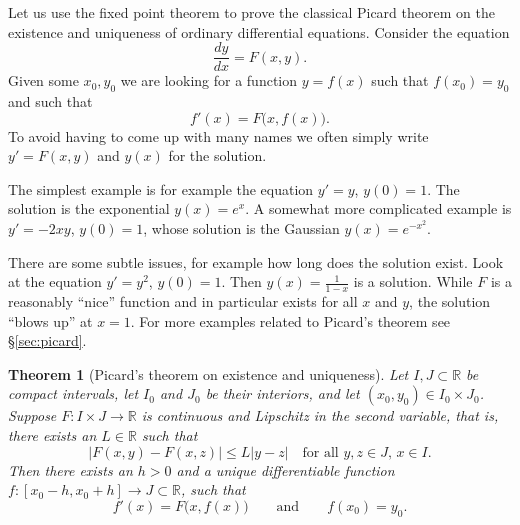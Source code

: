 \documentclass[12pt]{book}
\newcommand{\abs}[1]{\left\lvert {#1} \right\rvert}
\newcommand{\R}{{\mathbb{R}}}
\theoremstyle{plain}
\newtheorem{thm}{Theorem}[section]
\theoremstyle{remark}
\theoremstyle{definition}
\theoremstyle{exercise}
\theoremstyle{example}
\newcommand{\sectionref}[1]{\hyperref[#1]{\S\ref*{#1}}}
\begin{document}
\medskip

Let us use the
fixed point theorem
to prove the classical Picard theorem on the existence and uniqueness of
ordinary differential equations.
Consider the equation
\begin{equation*}
\frac{dy}{dx} = F(x,y) .
\end{equation*}
Given some $x_0, y_0$ we are looking for a function $y=f(x)$ such that
$f(x_0) = y_0$ and such that
\begin{equation*}
f'(x) = F\bigl(x,f(x)\bigr) .
\end{equation*}
To avoid having to come up with many names we often simply write $y' = F(x,y)$
and $y(x)$ for the solution.

The simplest example is for example the equation $y' = y$, $y(0) = 1$.
The solution is the exponential $y(x) = e^x$.  A somewhat more complicated
example is $y' = -2xy$, $y(0) = 1$, whose solution is the Gaussian
$y(x) = e^{-x^2}$.

There are some subtle issues, for example how long does the
solution exist.
Look at the equation $y' = y^2$, $y(0)=1$.  Then $y(x) = \frac{1}{1-x}$ is a
solution.  While $F$ is a reasonably ``nice'' function and in particular
exists for all $x$ and $y$, the solution ``blows up'' at $x=1$.
For more examples related to Picard's theorem see \sectionref{sec:picard}.

\begin{thm}[Picard's theorem on existence and uniqueness]%
Let $I, J \subset \R$ be compact intervals, let $I_0$ and $J_0$
be their interiors, and 
let $(x_0,y_0) \in I_0 \times J_0$.
Suppose $F \colon I \times J \to \R$ is continuous
and Lipschitz in the second variable, that is, there exists
an $L \in \R$ such that
\begin{equation*}
\abs{F(x,y) - F(x,z)} \leq L \abs{y-z}
\ \ \ \text{ for all $y,z \in J$, $x \in I$} .
\end{equation*}
Then there exists an $h > 0$ and a unique differentiable
function
$f \colon [x_0 - h, x_0 + h] \to J \subset \R$, such that
\begin{equation*}
f'(x) = F\bigl(x,f(x)\bigr) \qquad \text{and} \qquad f(x_0) = y_0.
\end{equation*}
\end{thm}
\end{document}
